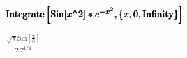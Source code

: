 \documentclass{article}
\begin{document}
\begin{doublespace}
\noindent\(\pmb{\text{}}\\
\pmb{\text{Integrate}\left[\text{Sin}[x{}^{\wedge}2]*e^{-x^2}, \{x, 0 , \text{Infinity}\}\right]}\)
\end{doublespace}

\begin{doublespace}
\noindent\(\frac{\sqrt{\pi } \text{Sin}\left[\frac{\pi }{8}\right]}{2\ 2^{1/4}}\)
\end{doublespace}
\end{document}
